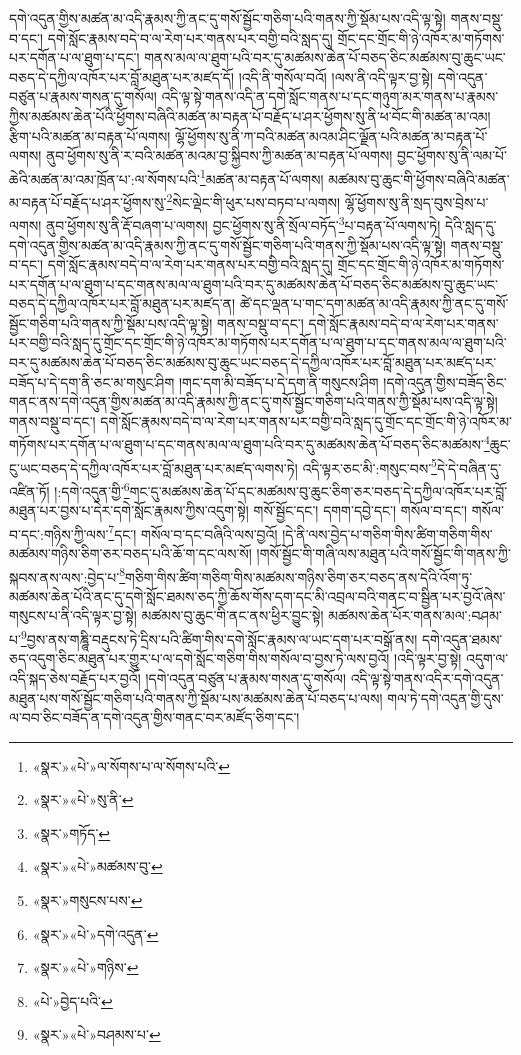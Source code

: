 དགེ་འདུན་གྱིས་མཚན་མ་འདི་རྣམས་ཀྱི་ནང་དུ་གསོ་སྦྱོང་གཅིག་པའི་གནས་ཀྱི་སྡོམ་པས་འདི་ལྟ་སྟེ། གནས་བསྡུ་བ་དང་། དགེ་སློང་རྣམས་བདེ་བ་ལ་རེག་པར་གནས་པར་བགྱི་བའི་སླད་དུ། གྲོང་དང་གྲོང་གི་ཉེ་འཁོར་མ་གཏོགས་པར་དགོན་པ་ལ་ཐུག་པ་དང་། གནས་མལ་ལ་ཐུག་པའི་བར་དུ་མཚམས་ཆེན་པོ་བཅད་ཅིང་མཚམས་བུ་ཆུང་ཡང་བཅད་དེ་དཀྱིལ་འཁོར་པར་བློ་མཐུན་པར་མཛད་དོ། །འདི་ནི་གསོལ་བའོ། །ལས་ནི་འདི་ལྟར་བྱ་སྟེ། དགེ་འདུན་བཙུན་པ་རྣམས་གསན་དུ་གསོལ། འདི་ལྟ་སྟེ་གནས་འདི་ན་དགེ་སློང་གནས་པ་དང་གཉུག་མར་གནས་པ་རྣམས་ཀྱིས་མཚམས་ཆེན་པོའི་ཕྱོགས་བཞིའི་མཚན་མ་བརྟན་པོ་བརྗོད་པ་ཤར་ཕྱོགས་སུ་ནི་ཕ་བོང་གི་མཚན་མ་འམ། རྩིག་པའི་མཚན་མ་བརྟན་པོ་ལགས། ལྷོ་ཕྱོགས་སུ་ནི་ཀ་བའི་མཚན་མའམ་ཤིང་ལྗོན་པའི་མཚན་མ་བརྟན་པོ་ལགས། ནུབ་ཕྱོགས་སུ་ནི་ར་བའི་མཚན་མའམ་བྱ་སྐྱིབས་ཀྱི་མཚན་མ་བརྟན་པོ་ལགས། བྱང་ཕྱོགས་སུ་ནི་ལམ་པོ་ཆེའི་མཚན་མ་འམ་ཁྲོན་པ་:ལ་སོགས་པའི་\footnote{«སྣར་»«པེ་»ལ་སོགས་པ་ལ་སོགས་པའི་}མཚན་མ་བརྟན་པོ་ལགས། མཚམས་བུ་ཆུང་གི་ཕྱོགས་བཞིའི་མཚན་མ་བརྟན་པོ་བརྗོད་པ་ཤར་ཕྱོགས་སུ་\footnote{«སྣར་»«པེ་»སུ་ནི་}སེང་ལྡེང་གི་ཕུར་པས་བཏབ་པ་ལགས། ལྷོ་ཕྱོགས་སུ་ནི་སྲད་བུས་བྲེས་པ་ལགས། ནུབ་ཕྱོགས་སུ་ནི་རྡོ་བཞག་པ་ལགས། བྱང་ཕྱོགས་སུ་ནི་སྲོལ་བཏོད་\footnote{«སྣར་»གཏོད་}པ་བརྟན་པོ་ལགས་ཏེ། དེའི་སླད་དུ་དགེ་འདུན་གྱིས་མཚན་མ་འདི་རྣམས་ཀྱི་ནང་དུ་གསོ་སྦྱོང་གཅིག་པའི་གནས་ཀྱི་སྡོམ་པས་འདི་ལྟ་སྟེ། གནས་བསྡུ་བ་དང་། དགེ་སློང་རྣམས་བདེ་བ་ལ་རེག་པར་གནས་པར་བགྱི་བའི་སླད་དུ། གྲོང་དང་གྲོང་གི་ཉེ་འཁོར་མ་གཏོགས་པར་དགོན་པ་ལ་ཐུག་པ་དང་གནས་མལ་ལ་ཐུག་པའི་བར་དུ་མཚམས་ཆེན་པོ་བཅད་ཅིང་མཚམས་བུ་ཆུང་ཡང་བཅད་དེ་དཀྱིལ་འཁོར་པར་བློ་མཐུན་པར་མཛད་ན། ཚེ་དང་ལྡན་པ་གང་དག་མཚན་མ་འདི་རྣམས་ཀྱི་ནང་དུ་གསོ་སྦྱོང་གཅིག་པའི་གནས་ཀྱི་སྡོམ་པས་འདི་ལྟ་སྟེ། གནས་བསྡུ་བ་དང་། དགེ་སློང་རྣམས་བདེ་བ་ལ་རེག་པར་གནས་པར་བགྱི་བའི་སླད་དུ་གྲོང་དང་གྲོང་གི་ཉེ་འཁོར་མ་གཏོགས་པར་དགོན་པ་ལ་ཐུག་པ་དང་གནས་མལ་ལ་ཐུག་པའི་བར་དུ་མཚམས་ཆེན་པོ་བཅད་ཅིང་མཚམས་བུ་ཆུང་ཡང་བཅད་དེ་དཀྱིལ་འཁོར་པར་བློ་མཐུན་པར་མཛད་པར་བཟོད་པ་དེ་དག་ནི་ཅང་མ་གསུང་ཤིག །གང་དག་མི་བཟོད་པ་དེ་དག་ནི་གསུངས་ཤིག །དགེ་འདུན་གྱིས་བཟོད་ཅིང་གནང་ནས་དགེ་འདུན་གྱིས་མཚན་མ་འདི་རྣམས་ཀྱི་ནང་དུ་གསོ་སྦྱོང་གཅིག་པའི་གནས་ཀྱི་སྡོམ་པས་འདི་ལྟ་སྟེ། གནས་བསྡུ་བ་དང་། དགེ་སློང་རྣམས་བདེ་བ་ལ་རེག་པར་གནས་པར་བགྱི་བའི་སླད་དུ་གྲོང་དང་གྲོང་གི་ཉེ་འཁོར་མ་གཏོགས་པར་དགོན་པ་ལ་ཐུག་པ་དང་གནས་མལ་ལ་ཐུག་པའི་བར་དུ་མཚམས་ཆེན་པོ་བཅད་ཅིང་མཚམས་\footnote{«སྣར་»«པེ་»མཚམས་བུ་}ཆུང་ངུ་ཡང་བཅད་དེ་དཀྱིལ་འཁོར་པར་བློ་མཐུན་པར་མཛད་ལགས་ཏེ། འདི་ལྟར་ཅང་མི་:གསུང་བས་\footnote{«སྣར་»གསུངས་པས་}དེ་དེ་བཞིན་དུ་འཛིན་ཏོ། །:དགེ་འདུན་གྱི་\footnote{«སྣར་»«པེ་»དགེ་འདུན་}གང་དུ་མཚམས་ཆེན་པོ་དང་མཚམས་བུ་ཆུང་ཅིག་ཅར་བཅད་དེ་དཀྱིལ་འཁོར་པར་བློ་མཐུན་པར་བྱས་པ་དེར་དགེ་སློང་རྣམས་ཀྱིས་འདུག་སྟེ། གསོ་སྦྱོང་དང་། དགག་དབྱེ་དང་། གསོལ་བ་དང་། གསོལ་བ་དང་:གཉིས་ཀྱི་ལས་\footnote{«སྣར་»«པེ་»གཉིས་}དང་། གསོལ་བ་དང་བཞིའི་ལས་བྱའོ། །དེ་ནི་ལས་བྱེད་པ་གཅིག་གིས་ཚིག་གཅིག་གིས་མཚམས་གཉིས་ཅིག་ཅར་བཅད་པའི་ཆོ་ག་དང་ལས་སོ། །གསོ་སྦྱོང་གི་གཞི་ལས་མཐུན་པའི་གསོ་སྦྱོང་གི་གནས་ཀྱི་སྐབས་ནས་ལས་:བྱེད་པ་\footnote{«པེ་»བྱེད་པའི་}གཅིག་གིས་ཚིག་གཅིག་གིས་མཚམས་གཉིས་ཅིག་ཅར་བཅད་ནས་དེའི་འོག་ཏུ་མཚམས་ཆེན་པོའི་ནང་དུ་དགེ་སློང་ཐམས་ཅད་ཀྱི་ཆོས་གོས་དག་དང་མི་འབྲལ་བའི་གནང་བ་སྦྱིན་པར་བྱའོ་ཞེས་གསུངས་པ་ནི་འདི་ལྟར་བྱ་སྟེ། མཚམས་བུ་ཆུང་གི་ནང་ནས་ཕྱིར་བྱུང་སྟེ། མཚམས་ཆེན་པོར་གནས་མལ་:བཤམ་པ་\footnote{«སྣར་»«པེ་»བཤམས་པ་}བྱས་ནས་གཎྜཱི་བརྡུངས་ཏེ་དྲིས་པའི་ཚིག་གིས་དགེ་སློང་རྣམས་ལ་ཡང་དག་པར་བསྒོ་ནས། དགེ་འདུན་ཐམས་ཅད་འདུག་ཅིང་མཐུན་པར་གྱུར་པ་ལ་དགེ་སློང་གཅིག་གིས་གསོལ་བ་བྱས་ཏེ་ལས་བྱའོ། །འདི་ལྟར་བྱ་སྟེ། འདུག་ལ་འདི་སྐད་ཅེས་བརྗོད་པར་བྱའོ། །དགེ་འདུན་བཙུན་པ་རྣམས་གསན་དུ་གསོལ། འདི་ལྟ་སྟེ་གནས་འདིར་དགེ་འདུན་མཐུན་པས་གསོ་སྦྱོང་གཅིག་པའི་གནས་ཀྱི་སྡོམ་པས་མཚམས་ཆེན་པོ་བཅད་པ་ལས། གལ་ཏེ་དགེ་འདུན་གྱི་དུས་ལ་བབ་ཅིང་བཟོད་ན་དགེ་འདུན་གྱིས་གནང་བར་མཛོད་ཅིག་དང་། 